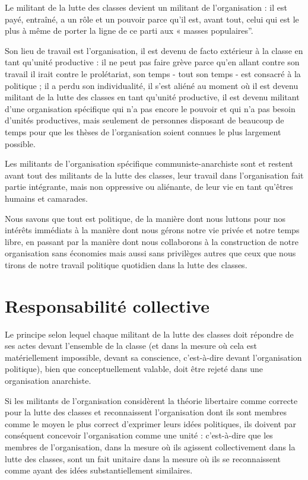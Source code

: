 Le militant de la lutte des classes devient un militant de l'organisation : il est payé, entraîné, a un rôle et un pouvoir parce qu'il est, avant tout, celui qui est le plus à même de porter la ligne de ce parti aux « masses populaires''.

Son lieu de travail est l'organisation, il est devenu de facto extérieur à la classe en tant qu'unité productive : il ne peut pas faire grève parce qu'en allant contre son travail il irait contre le prolétariat, son temps - tout son temps - est consacré à la politique ; il a perdu son individualité, il s'est aliéné au moment où il est devenu militant de la lutte des classes en tant qu'unité productive, il est devenu militant d'une organisation spécifique qui n'a pas encore le pouvoir et qui n'a pas besoin d'unités productives, mais seulement de personnes disposant de beaucoup de temps pour que les thèses de l'organisation soient connues le plus largement possible.

Les militants de l'organisation spécifique communiste-anarchiste sont et restent avant tout des militants de la lutte des classes, leur travail dans l'organisation fait partie intégrante, mais non oppressive ou aliénante, de leur vie en tant qu'êtres humains et camarades.

Nous savons que tout est politique, de la manière dont nous luttons pour nos intérêts immédiats à la manière dont nous gérons notre vie privée et notre temps libre, en passant par la manière dont nous collaborons à la construction de notre organisation sans économies mais aussi sans privilèges autres que ceux que nous tirons de notre travail politique quotidien dans la lutte des classes.

\section{Responsabilité collective}\hypertarget{responsabilit-collective}{}\label{responsabilit-collective}

Le principe selon lequel chaque militant de la lutte des classes doit répondre de ses actes devant l'ensemble de la classe (et dans la mesure où cela est matériellement impossible, devant sa conscience, c'est-à-dire devant l'organisation politique), bien que conceptuellement valable, doit être rejeté dans une organisation anarchiste.

Si les militants de l'organisation considèrent la théorie libertaire comme correcte pour la lutte des classes et reconnaissent l'organisation dont ils sont membres comme le moyen le plus correct d'exprimer leurs idées politiques, ils doivent par conséquent concevoir l'organisation comme une unité : c'est-à-dire que les membres de l'organisation, dans la mesure où ils agissent collectivement dans la lutte des classes, sont un fait unitaire dans la mesure où ils se reconnaissent comme ayant des idées substantiellement similaires.

